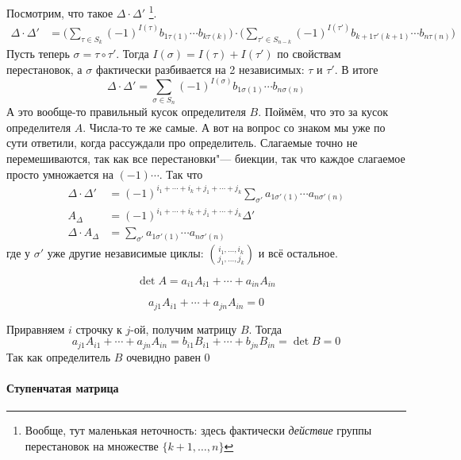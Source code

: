 \documentclass[12pt]{../../../notes}
\begin{document}
\begin{ittproof}
  Посмотрим, что такое  $\Delta\cdot \Delta'$
  \footnote{Вообще, тут маленькая неточность: здесь фактически 
      \emph{действие} группы перестановок на множестве $\{k+1, \dotsc , n\}$}.
  \begin{align*}
    \Delta \cdot \Delta' 
    &= \Bigg( \sum_{\tau \in S_k} (-1)^{I(\tau)} b_{1\tau(1)} \dotsm
    b_{k\tau(k)} \Bigg) \cdot \Bigg( \sum_{\tau' \in S_{n-k}} (-1)^{I(\tau')} b_{k+1\tau'(k+1)} \dotsm
    b_{n\tau(n)} \Bigg)
  \end{align*}
  Пусть теперь $\sigma = \tau \circ \tau'$. Тогда $I(\sigma) = I(\tau)+I(\tau')$ по свойствам
  перестановок, а $\sigma$ фактически разбивается на 2 независимых: $\tau$ и $\tau'$.
  В итоге
  \[
    \Delta \cdot \Delta' 
    = \sum_{\sigma\in S_n} (-1)^{I(\sigma)} b_{1\sigma(1)} \dotsm b_{n\sigma(n)}
  \]
  А это вообще-то правильный кусок определителя $B$. 
  Поймём, что это за кусок определителя $A$.
  Числа-то те же самые. А вот на вопрос со знаком мы уже по сути ответили, когда рассуждали про 
  определитель. Слагаемые точно не перемешиваются, так как все перестановки"--- биекции, 
  так что каждое слагаемое просто умножается на $(-1){\cdots}$. 
  Так что 
  \begin{align*}
    \Delta \cdot \Delta' &= (-1)^{i_1  + \dotsb + i_k  + j_1  + \dotsb + j_k } 
    \sum_{\sigma'} a_{1\sigma'(1)} \dotsm a_{n\sigma'(n)} \\
    A_{\Delta} &= (-1)^{i_1  + \dotsb + i_k  + j_1  + \dotsb + j_k } \Delta'  \\
    \Delta \cdot A_{\Delta} &= \sum_{\sigma'} a_{1\sigma'(1)} \dotsm a_{n\sigma'(n)}
  \end{align*}
  где у $\sigma'$ уже другие независимые циклы: ${i_1, \dotsc , i_k\choose j_1, \dotsc , j_k }$ 
  и всё остальное.

\end{ittproof}
\begin{imp}
  \[
    \det A = a_{i1} A_{i1} + \dotsb + a_{in} A_{in} 
  \]
\end{imp}
\begin{imp}
  \[
    a_{j1} A_{i1} + \dotsb + a_{jn} A_{in} = 0
  \]
\end{imp}
\begin{itlproof}
  Приравняем $i$ строчку к $j$-ой, получим матрицу $B$. Тогда
  \[
    a_{j1} A_{i1} + \dotsb + a_{jn} A_{in} = b_{i1} B_{i1} + \dotsb + b_{jn} B_{in} = \det B = 0
  \]
  Так как определитель $B$ очевидно равен 0
\end{itlproof}

\paragraph{Ступенчатая матрица}
\end{document}
